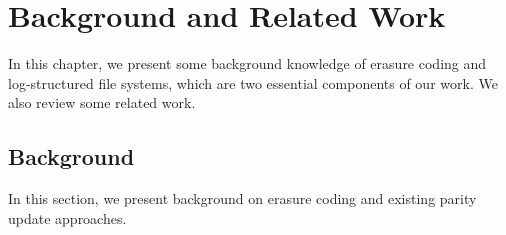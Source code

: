 \chapter{Background and Related Work}
\label{chap:background}

In this chapter, we present some background knowledge of erasure coding and
log-structured file systems, which are two essential components of our work.
We also review some related work.

\section{Background}

In this section, we present background on erasure coding and existing parity
update approaches.


%




